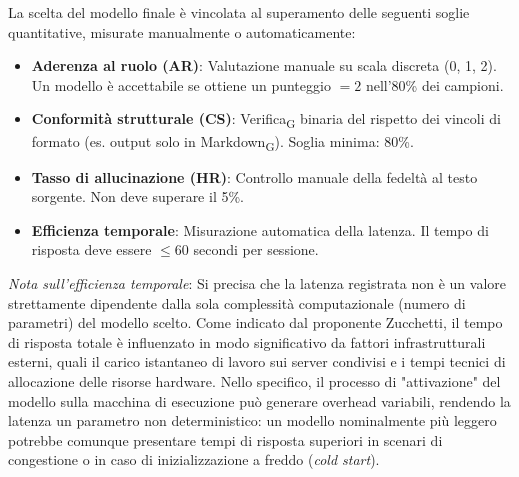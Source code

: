 \documentclass[11pt,a4paper]{article}
\newcommand{\gls}[1]{#1\textsubscript{G}}
\begin{document}
La scelta del modello finale è vincolata al superamento delle seguenti soglie quantitative, misurate manualmente o automaticamente:
\begin{itemize}
    \item \textbf{Aderenza al ruolo (AR)}: Valutazione manuale su scala discreta (0, 1, 2). Un modello è accettabile se ottiene un punteggio $= 2$ nell'80\% dei campioni.
    \item \textbf{Conformità strutturale (CS)}: \gls{Verifica} binaria del rispetto dei vincoli di formato (es. output solo in \gls{Markdown}). Soglia minima: 80\%.
    \item \textbf{Tasso di allucinazione (HR)}: Controllo manuale della fedeltà al testo sorgente. Non deve superare il 5\%.
    \item \textbf{Efficienza temporale}: Misurazione automatica della latenza. Il tempo di risposta deve essere $\le 60$ secondi per sessione.
\end{itemize}

\textit{Nota sull'efficienza temporale}: Si precisa che la latenza registrata non è un valore strettamente dipendente dalla sola complessità computazionale (numero di parametri) del modello scelto. Come indicato dal proponente Zucchetti, il tempo di risposta totale è influenzato in modo significativo da fattori infrastrutturali esterni, quali il carico istantaneo di lavoro sui server condivisi e i tempi tecnici di allocazione delle risorse hardware. Nello specifico, il processo di "attivazione" del modello sulla macchina di esecuzione può generare overhead variabili, rendendo la latenza un parametro non deterministico: un modello nominalmente più leggero potrebbe comunque presentare tempi di risposta superiori in scenari di congestione o in caso di inizializzazione a freddo (\textit{cold start}).
\end{document}
